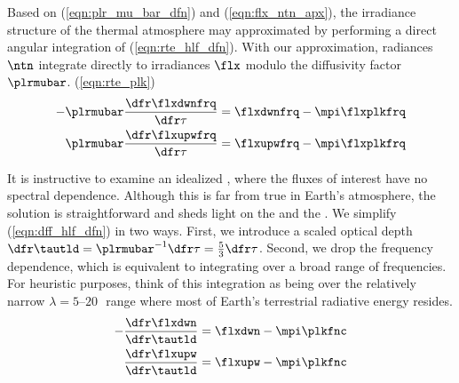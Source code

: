 \documentclass[12pt]{article}
\begin{document}
Based on (\ref{eqn:plr_mu_bar_dfn}) and (\ref{eqn:flx_ntn_apx}),
the irradiance structure of the thermal atmosphere may approximated
by performing a direct angular integration of (\ref{eqn:rte_hlf_dfn}).
With our approximation, radiances $\ntn$ integrate directly to
irradiances $\flx$ modulo the diffusivity factor $\plrmubar$. 
(\ref{eqn:rte_plk})
\begin{subequations}
\label{eqn:dff_hlf_dfn}
\begin{align}
\label{eqn:dff_hlf_dwn_dfn}
-\plrmubar \frac{\dfr\flxdwnfrq}{\dfr\tau} & = \flxdwnfrq - \mpi\flxplkfrq \\
\label{eqn:dff_hlf_upw_dfn}
\plrmubar \frac{\dfr\flxupwfrq}{\dfr\tau} & = \flxupwfrq - \mpi\flxplkfrq
\end{align}
\end{subequations}

It is instructive to examine an idealized ,
where the fluxes of interest have no spectral dependence.
Although this is far from true in Earth's atmosphere, the solution is
straightforward and sheds light on the 
 and the 
. 
We simplify (\ref{eqn:dff_hlf_dfn}) in two ways.
First, we introduce a scaled optical depth
$\dfr\tautld = \plrmubar^{-1}\dfr\tau = \frac{5}{3}\dfr\tau$.
Second, we drop the frequency dependence, which is equivalent to
integrating over a broad range of frequencies.
For heuristic purposes, think of this integration as being over the
relatively narrow $\lambda = 5$--$20$\,\um\ range where most of
Earth's terrestrial radiative energy resides.
\begin{subequations}
\label{eqn:gry_hlf_dfn}
\begin{align}
\label{eqn:gry_hlf_dwn_dfn}
-\frac{\dfr\flxdwn}{\dfr\tautld} & = \flxdwn - \mpi\plkfnc \\
\label{eqn:gry_hlf_upw_dfn}
\frac{\dfr\flxupw}{\dfr\tautld} & = \flxupw - \mpi\plkfnc
\end{align}
\end{subequations}
\end{document}
